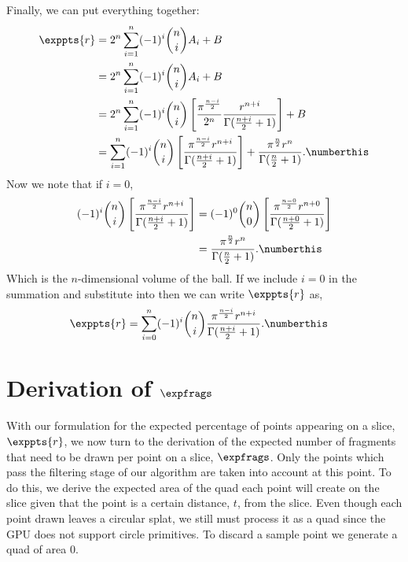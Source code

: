 Finally, we can put everything together:
\begin{align*}
\exppts{r} &= 2^n \sum_{i=1}^{n} (-1)^{i} {n \choose i} A_i + B \\
  &= 2^n \sum_{i=1}^{n} (-1)^{i} {n \choose i} A_i + B \\
  &= 2^n \sum_{i=1}^{n} (-1)^{i} {n \choose i}\left[ 
       \frac{\pi^\frac{n-i}{2}}{2^{n}}\frac{r^{n+i}}{\Gamma(\frac{n+i}{2} + 1)}
     \right] + B \\
  &= \sum_{i=1}^{n} (-1)^{i} {n \choose i}\left[ 
       \frac{\pi^\frac{n-i}{2}r^{n+i}}{\Gamma(\frac{n+i}{2} + 1)} 
     \right] 
     + \frac{\pi^\frac{n}{2} r^n}{\Gamma(\frac{n}{2}+1)}
        \text{.}
  \numberthis \label{eq:pre_exppts}
\end{align*}
Now we note that if $i=0$,
\begin{align*}
  (-1)^{i} {n \choose i}\left[ 
       \frac{\pi^\frac{n-i}{2}r^{n+i}}{\Gamma(\frac{n+i}{2} + 1)} 
     \right] 
    &= (-1)^{0} {n \choose 0}\left[ 
       \frac{\pi^\frac{n-0}{2}r^{n+0}}{\Gamma(\frac{n+0}{2} + 1)} 
     \right] \\
    &= \frac{\pi^\frac{n}{2}r^{n}}{\Gamma(\frac{n}{2} + 1)} 
       \text{.}
      \numberthis \label{eq:exppts_0}
\end{align*}
Which is the $n$-dimensional volume of the ball.
If we include $i=0$ in the summation and substitute  
into  then we can write $\exppts{r}$ as,
\begin{align*}
\exppts{r} 
  &= \sum_{i=0}^{n} (-1)^{i} {n \choose i}
         \frac{\pi^\frac{n-i}{2}r^{n+i}}{\Gamma(\frac{n+i}{2} + 1)} 
            \text{.}
  \numberthis \label{eq:exppts}
\end{align*}

\section{Derivation of $\expfrags$}
\label{sec:app:expfrags}

With our formulation for the expected percentage of points appearing on a
slice, $\exppts{r}$, we now turn to the derivation of the expected
number of fragments that need to be drawn per point on a slice, 
$\expfrags$. Only the points which pass the filtering stage of our algorithm
are taken into account at this point. 
To do this,
we derive the expected area of 
the quad each point will create on the slice given that the point is a certain
distance, $t$, from the slice. Even though each point drawn
leaves a circular splat, we still must process it as a quad since the GPU
does not support circle primitives. To discard a sample point we generate a
quad of area $0$.

